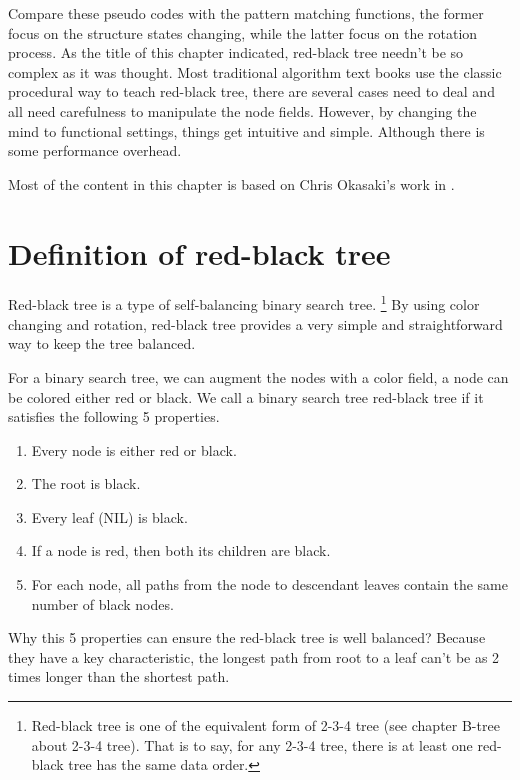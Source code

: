 \documentclass{article}
\begin{document}
Compare these pseudo codes with the pattern matching functions,
the former focus on the structure states changing, while the
latter focus on the rotation process. As the title of this
chapter indicated, red-black tree needn't be so complex as it
was thought. Most traditional algorithm text books use the
classic procedural way to teach red-black tree, there are
several cases need to deal and all need carefulness to
manipulate the node fields. However, by changing
the mind to functional settings, things get intuitive and
simple. Although there is some performance overhead.

Most of the content in this chapter is based on Chris Okasaki's
work in \cite{okasaki}.

\section{Definition of red-black tree}

Red-black tree is a type of self-balancing binary search tree\cite{wiki}.
\footnote{Red-black tree is one of the equivalent form of 2-3-4 tree (see chapter
B-tree about 2-3-4 tree). That is to say, for any 2-3-4 tree, there is at least
one red-black tree has the same data order.} By using color changing and rotation,
red-black tree provides a very simple and straightforward way to keep
the tree balanced.

For a binary search tree, we can augment the nodes with a color field, a node
can be colored either red or black. We call a binary search tree red-black tree
if it satisfies the following 5 properties\cite{CLRS}.

\begin{enumerate}
\item Every node is either red or black.
\item The root is black.
\item Every leaf (NIL) is black.
\item If a node is red, then both its children are black.
\item For each node, all paths from the node to descendant leaves contain the same number of black nodes.
\end{enumerate}

Why this 5 properties can ensure the red-black tree is well balanced?
Because they have a key characteristic, the longest path from root to
a leaf can't be as 2 times longer than the shortest path.
\end{document}
